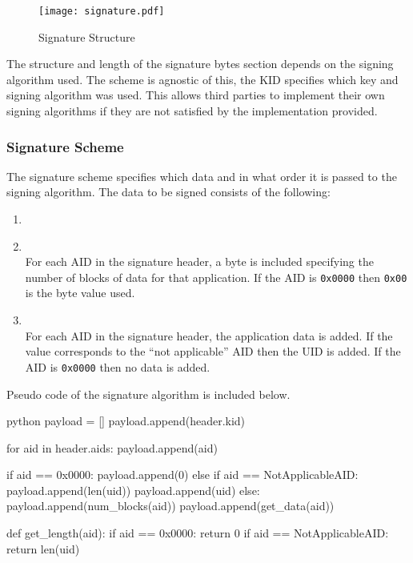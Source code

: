 \documentclass[dissertation.tex]{subfiles}
\begin{document}
  \begin{figure}[h]
    \centering
    \texttt{[image: signature.pdf]}
    \caption{Signature Structure}\label{fig:signature_structure}
  \end{figure}

  The structure and length of the signature bytes section depends on the signing algorithm used. The scheme is agnostic of this, the KID specifies which key and signing algorithm was used. This allows third parties to implement their own signing algorithms if they are not satisfied by the implementation provided.

  \subsubsection{Signature Scheme}
  The signature scheme specifies which data and in what order it is passed to the signing algorithm. The data to be signed consists of the following:
  \begin{enumerate}
    \item {}
    \item {} \\
      For each AID in the signature header, a byte is included specifying the number of blocks of data for that application. If the AID is \texttt{0x0000} then \texttt{0x00} is the byte value used.
    \item {} \\
      For each AID in the signature header, the application data is added. If the value corresponds to the ``not applicable'' AID then the UID is added. If the AID is \texttt{0x0000} then no data is added.
  \end{enumerate}

  Pseudo code of the signature algorithm is included below.
  \begin{code}[numbers=none]{python}
    payload = []
    payload.append(header.kid)

    for aid in header.aids:
        payload.append(aid)

        if aid == 0x0000:
            payload.append(0)
        else if aid == NotApplicableAID:
            payload.append(len(uid))
            payload.append(uid)
        else:
            payload.append(num_blocks(aid))
            payload.append(get_data(aid))

    def get_length(aid):
        if aid == 0x0000:
            return 0
        if aid == NotApplicableAID:
            return len(uid)
  \end{code}
\end{document}

